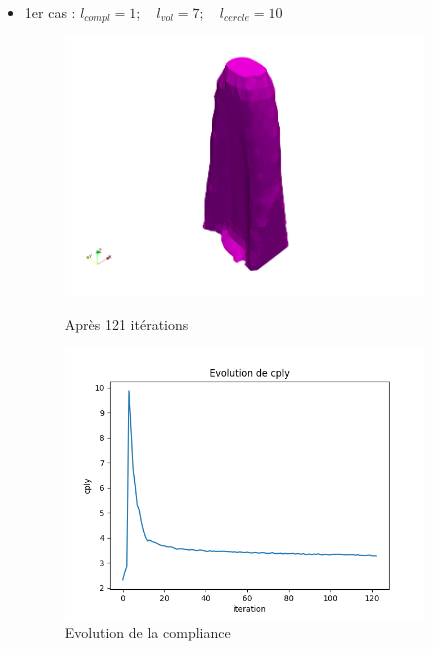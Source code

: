 \documentclass[11pt,a4paper]{article}
\begin{document}
\begin{itemize}
	\item 1er cas : $l_{compl}=1;\quad l_{vol}=7; \quad l_{cercle}=10$

\begin{figure}[H]
	\begin{minipage}{0.48\textwidth}
		\includegraphics[width=0.9\textwidth]{it121lv7lc1lc10.png}
		\caption{Après 121 itérations}
	\end{minipage}	
	\begin{minipage}{0.48\textwidth}
		\includegraphics[width=0.9\textwidth]{lv7lc1lC10cply.png}
		\caption{Evolution de la compliance}
	\end{minipage}	
\end{figure}


\end{itemize}
\end{document}
